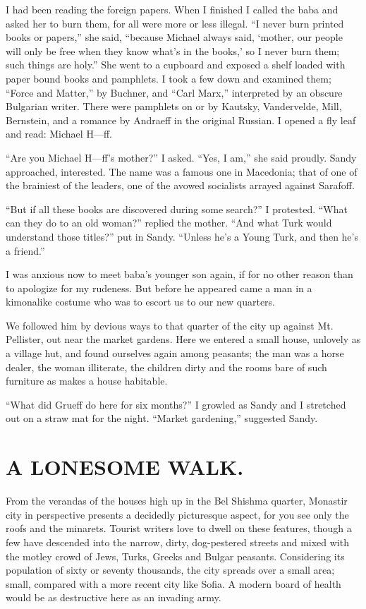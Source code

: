 \documentclass[a5paper,12pt]{book}
\begin{document}
I had been reading the foreign papers. When I finished I called the baba and asked her to burn them, for all were more or less illegal. “I never burn printed books or papers,” she said, “because Michael always said, ‘mother, our people will only be free when they know what’s in the books,’ so I never burn them; such things are holy.” She went to a cupboard and exposed a shelf loaded with paper bound books and pamphlets. I took a few down and examined them; “Force and Matter,” by Buchner, and “Carl Marx,” interpreted by an obscure Bulgarian writer. There were pamphlets on or by Kautsky, Vandervelde, Mill, Bernstein, and a romance by Andraeff in the original Russian. I opened a fly leaf and read: Michael H—ff.

“Are you Michael H—ff’s mother?” I asked. “Yes, I am,” she said proudly. Sandy approached, interested. The name was a famous one in Macedonia; that of one of the brainiest of the leaders, one of the avowed socialists arrayed against Sarafoff.

“But if all these books are discovered during some search?” I protested. “What can they do to an old woman?” replied the mother. “And what Turk would understand those titles?” put in Sandy. “Unless he’s a Young Turk, and then he’s a friend.”

I was anxious now to meet baba’s younger son again, if for no other reason than to apologize for my rudeness. But before he appeared came a man in a kimonalike costume who was to escort us to our new quarters.

We followed him by devious ways to that quarter of the city up against Mt. Pellister, out near the market gardens. Here we entered a small house, unlovely as a village hut, and found ourselves again among peasants; the man was a horse dealer, the woman illiterate, the children dirty and the rooms bare of such furniture as makes a house habitable.

“What did Grueff do here for six months?” I growled as Sandy and I stretched out on a straw mat for the night. “Market gardening,” suggested Sandy.


\chapter{A LONESOME WALK.}

From the verandas of the houses high up in the Bel Shishma quarter, Monastir city in perspective presents a decidedly picturesque aspect, for you see only the roofs and the minarets. Tourist writers love to dwell on these features, though a few have descended into the narrow, dirty, dog-pestered streets and mixed with the motley crowd of Jews, Turks, Greeks and Bulgar peasants. Considering its population of sixty or seventy thousands, the city spreads over a small area; small, compared with a more recent city like Sofia. A modern board of health would be as destructive here as an invading army.
\end{document}
